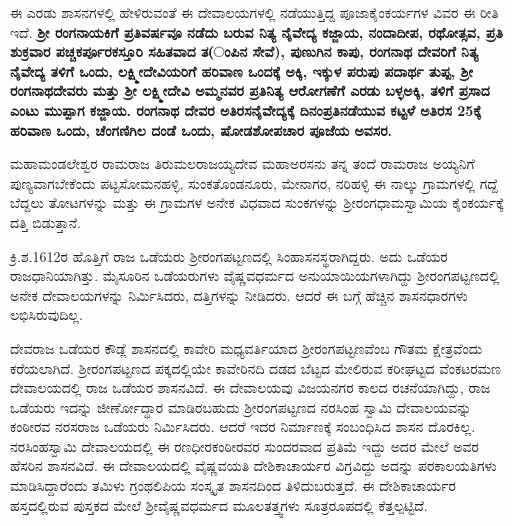 ಈ ಎರಡು ಶಾಸನಗಳಲ್ಲಿ ಹೇಳಿರುವಂತೆ ಈ ದೇವಾಲಯಗಳಲ್ಲಿ ನಡೆಯುತ್ತಿದ್ದ ಪೂಜಾಕೈಂಕರ್ಯಗಳ ವಿವರ ಈ ರೀತಿ ಇದೆ. \textbf{ಶ‍್ರೀ ರಂಗನಾಯಕಿಗೆ ಪ್ರತಿವರ್ಷವೂ ನಡೆದು ಬರುವ ನಿತ್ಯ ನೈವೇದ್ಯ ಕಜ್ಜಾಯ, ನಂದಾದೀಪ, ರಥೋತ್ಸವ, ಪ್ರತಿ ಶುಕ್ರವಾರ ಪಚ್ಚಕರ್ಪೂರಕಸ್ತೂರಿ ಸಹಿತವಾದ ತ(ಂಪಿನ ಸೇವೆ), ಪುಣುಗಿನ ಕಾಪು, ರಂಗನಾಥ ದೇವರಿಗೆ ನಿತ್ಯ ನೈವೇದ್ಯ ತಳಿಗೆ ಒಂದು, ಲಕ್ಷ್ಮೀದೇವಿಯರಿಗೆ ಹರಿವಾಣ ಒಂದಕ್ಕೆ ಅಕ್ಕಿ, ಇಕ್ಕುಳ ಪರುಪು ಪದಾರ್ಥ ತುಪ್ಪ, ಶ‍್ರೀ ರಂಗನಾಥದೇವರು ಮತ್ತು ಶ‍್ರೀ ಲಕ್ಷ್ಮೀದೇವಿ ಅಮ್ಮನವರ ಪ್ರತಿನಿತ್ಯ ಆರೋಗಣೆಗೆ ಎರಡು ಬಳ್ಳಅಕ್ಕಿ, ತಳಿಗೆ ಪ್ರಸಾದ ಎಂಟು ಮುಪ್ಪಾಗ ಕಜ್ಜಾಯ. ರಂಗನಾಥ ದೇವರ ಅತಿರಸನೈವೇದ್ಯಕ್ಕೆ ದಿನಂಪ್ರತಿನಡೆಯುವ ಕಟ್ಟಳೆ ಅತಿರಸ 25ಕ್ಕೆ ಹರಿವಾಣ ಒಂದು, ಚೆಂಗಣಿಗಿಲ ದಂಡೆ ಒಂದು, ಷೋಡಶೋಪಚಾರ ಪೂಜೆಯ ಅವಸರ. }

ಮಹಾಮಂಡಲೇಶ್ವರ ರಾಮರಾಜ ತಿರುಮಲರಾಜಯ್ಯದೇವ ಮಹಾಅರಸನು ತನ್ನ ತಂದೆ ರಾಮರಾಜ ಅಯ್ಯನಿಗೆ ಪುಣ್ಯವಾಗಬೇಕೆಂದು ಪಟ್ಟಸೋಮನಹಳ್ಳಿ, ಸುಂಕತೊಂಡನೂರು, ಮೇನಾಗರ, ನರಿಹಳ್ಳಿ ಈ ನಾಲ್ಕು ಗ್ರಾಮಗಳಲ್ಲಿ ಗದ್ದೆ ಬೆದ್ದಲು ತೋಟಗಳನ್ನು ಮತ್ತು ಈ ಗ್ರಾಮಗಳ ಅನೇಕ ವಿಧವಾದ ಸುಂಕಗಳನ್ನು ಶ‍್ರೀರಂಗಧಾಮಸ್ವಾಮಿಯ ಕೈಂಕರ್ಯಕ್ಕೆ ದತ್ತಿ ಬಿಡುತ್ತಾನೆ.

ಕ್ರಿ.ಶ.1612ರ ಹೊತ್ತಿಗೆ ರಾಜ ಒಡೆಯರು ಶ‍್ರೀರಂಗಪಟ್ಟಣದಲ್ಲಿ ಸಿಂಹಾಸನಸ್ಥರಾಗಿದ್ದರು. ಅದು ಒಡೆಯರ ರಾಜಧಾನಿಯಾಗಿತ್ತು. ಮೈಸೂರಿನ ಒಡೆಯರುಗಳು ವೈಷ್ಣವಧರ್ಮದ ಅನುಯಾಯಿಯಗಳಾಗಿದ್ದು ಶ‍್ರೀರಂಗಪಟ್ಟಣದಲ್ಲಿ ಅನೇಕ ದೇವಾಲಯಗಳನ್ನು ನಿರ್ಮಿಸಿದರು, ದತ್ತಿಗಳನ್ನು ನೀಡಿದರು. ಆದರೆ ಈ ಬಗ್ಗೆ ಹೆಚ್ಚಿನ ಶಾಸನಧಾರಗಳು ಲಭಿಸಿರುವುದಿಲ್ಲ.

ದೇವರಾಜ ಒಡೆಯರ ಕೌಡ್ಲೆ ಶಾಸನದಲ್ಲಿ ಕಾವೇರಿ ಮಧ್ಯವರ್ತಿಯಾದ ಶ‍್ರೀರಂಗಪಟ್ಟಣವೆಂಬ ಗೌತಮ ಕ್ಷೇತ್ರವೆಂದು ಕರೆಯಲಾಗಿದೆ. ಶ‍್ರೀರಂಗಪಟ್ಟಣದ ಪಕ್ಕದಲ್ಲಿಯೇ ಕಾವೇರಿನದಿ ದಡದ ಬೆಟ್ಟದ ಮೇಲಿರುವ ಕರೀಘಟ್ಟದ ವೆಂಕಟರಮಣ ದೇವಾಲಯದಲ್ಲಿ ರಾಜ ಒಡೆಯರ ಶಾಸನವಿದೆ. ಈ ದೇವಾಲಯವು ವಿಜಯನಗರ ಕಾಲದ ರಚನೆಯಾಗಿದ್ದು, ರಾಜ ಒಡೆಯರು ಇದನ್ನು ಜೀರ್ಣೋದ್ಧಾರ ಮಾಡಿರಬಹುದು ಶ‍್ರೀರಂಗಪಟ್ಟಣದ ನರಸಿಂಹ ಸ್ವಾಮಿ ದೇವಾಲಯವನ್ನು ಕಂಠೀರವ ನರಸರಾಜ ಒಡೆಯರು ನಿರ್ಮಿಸಿದರು. ಆದರೆ ಇದರ ನಿರ್ಮಾಣಕ್ಕೆ ಸಂಬಂಧಿಸಿದ ಶಾಸನ ದೊರಕಿಲ್ಲ. ನರಸಿಂಹಸ್ವಾಮಿ ದೇವಾಲಯದಲ್ಲಿ ಈ ರಣಧೀರಕಂಠೀರವರ ಸುಂದರವಾದ ಪ್ರತಿಮೆ ಇದ್ದು ಅದರ ಮೇಲೆ ಅವರ ಹೆಸರಿನ ಶಾಸನವಿದೆ. ಈ ದೇವಾಲಯದಲ್ಲಿ ವೈಷ್ಣವಯತಿ ದೇಶಿಕಾಚಾರ್ಯರ ವಿಗ್ರವಿದ್ದು ಅದನ್ನು ಪರಕಾಲಯತಿಗಳು ಮಾಡಿಸಿದ್ದಾರೆಂದು ತಮಿಳು ಗ್ರಂಥಲಿಪಿಯ ಸಂಸ್ಕೃತ ಶಾಸನದಿಂದ ತಿಳಿದುಬರುತ್ತದೆ. ಈ ದೇಶಿಕಾಚಾರ್ಯರ ಹಸ್ತದಲ್ಲಿರುವ ಪುಸ್ತಕದ ಮೇಲೆ ಶ‍್ರೀವೈಷ್ಣವಧರ್ಮದ ಮೂಲತತ್ತ್ವಗಳು ಸೂತ್ರರೂಪದಲ್ಲಿ ಕೆತ್ತಲ್ಪಟ್ಟಿದೆ.


